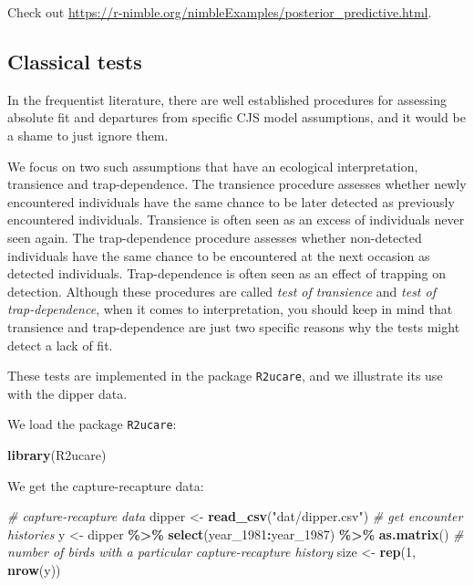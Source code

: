 \documentclass[
  12pt,
]{krantz}
\newenvironment{Shaded}{\begin{snugshade}}{\end{snugshade}}
\newcommand{\CommentTok}[1]{\textcolor[rgb]{0.56,0.35,0.01}{\textit{#1}}}
\newcommand{\DecValTok}[1]{\textcolor[rgb]{0.00,0.00,0.81}{#1}}
\newcommand{\FunctionTok}[1]{\textcolor[rgb]{0.13,0.29,0.53}{\textbf{#1}}}
\newcommand{\NormalTok}[1]{#1}
\newcommand{\OtherTok}[1]{\textcolor[rgb]{0.56,0.35,0.01}{#1}}
\newcommand{\SpecialCharTok}[1]{\textcolor[rgb]{0.81,0.36,0.00}{\textbf{#1}}}
\newcommand{\StringTok}[1]{\textcolor[rgb]{0.31,0.60,0.02}{#1}}
\begin{document}
Check out \url{https://r-nimble.org/nimbleExamples/posterior_predictive.html}.

\subsection{Classical tests}\label{classical-tests}

In the frequentist literature, there are well established procedures for assessing absolute fit and departures from specific CJS model assumptions, and it would be a shame to just ignore them.

We focus on two such assumptions that have an ecological interpretation, transience and trap-dependence. The transience procedure assesses whether newly encountered individuals have the same chance to be later detected as previously encountered individuals. Transience is often seen as an excess of individuals never seen again. The trap-dependence procedure assesses whether non-detected individuals have the same chance to be encountered at the next occasion as detected individuals. Trap-dependence is often seen as an effect of trapping on detection. Although these procedures are called \emph{test of transience} and \emph{test of trap-dependence}, when it comes to interpretation, you should keep in mind that transience and trap-dependence are just two specific reasons why the tests might detect a lack of fit.

These tests are implemented in the package \texttt{R2ucare}, and we illustrate its use with the dipper data.

We load the package \texttt{R2ucare}:

\begin{Shaded}
\begin{Highlighting}[]
\FunctionTok{library}\NormalTok{(R2ucare)}
\end{Highlighting}
\end{Shaded}

We get the capture-recapture data:

\begin{Shaded}
\begin{Highlighting}[]
\CommentTok{\# capture{-}recapture data}
\NormalTok{dipper }\OtherTok{\textless{}{-}} \FunctionTok{read\_csv}\NormalTok{(}\StringTok{"dat/dipper.csv"}\NormalTok{)}
\CommentTok{\# get encounter histories}
\NormalTok{y }\OtherTok{\textless{}{-}}\NormalTok{ dipper }\SpecialCharTok{\%\textgreater{}\%}
  \FunctionTok{select}\NormalTok{(year\_1981}\SpecialCharTok{:}\NormalTok{year\_1987) }\SpecialCharTok{\%\textgreater{}\%}
  \FunctionTok{as.matrix}\NormalTok{()}
\CommentTok{\# number of birds with a particular capture{-}recapture history}
\NormalTok{size }\OtherTok{\textless{}{-}} \FunctionTok{rep}\NormalTok{(}\DecValTok{1}\NormalTok{, }\FunctionTok{nrow}\NormalTok{(y))}
\end{Highlighting}
\end{Shaded}
\end{document}
